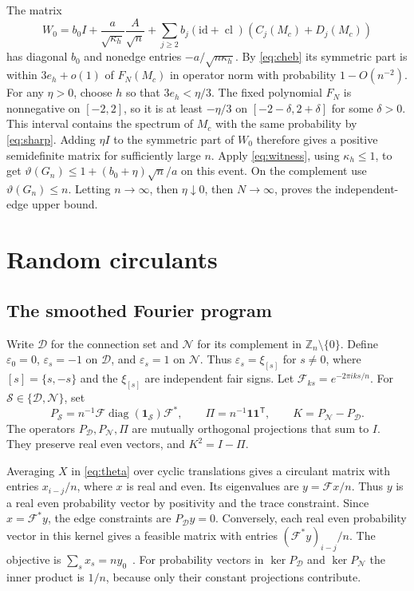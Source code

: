 \documentclass[preprints,article,submit,oneauthor]{Definitions/mdpi}
\newcommand{\Z}{\mathbb Z}
\newcommand{\one}{\mathbf 1}
\begin{document}
The matrix
\[
 W_0=b_0 I+\frac{a}{\sqrt{\kappa_h}}\frac{A}{\sqrt n}
       +\sum_{j\ge2} b_j (\mathrm{id}+\operatorname{cl})(C_j(M_c)+D_j(M_c))
\]
has diagonal \(b_0\) and nonedge entries \(-a/\sqrt{n\kappa_h}\). By
\eqref{eq:cheb} its symmetric part is within \(3e_h+o(1)\) of
\(F_N(M_c)\) in operator norm with probability \(1-O(n^{-2})\).
For any \(\eta>0\), choose \(h\) so that \(3e_h<\eta/3\). The fixed
polynomial \(F_N\) is nonnegative on \([-2,2]\), so it is at least
\(-\eta/3\) on \([-2-\delta,2+\delta]\) for some \(\delta>0\). This
interval contains the spectrum of \(M_c\) with the same probability
by \eqref{eq:sharp}. Adding \(\eta I\) to the symmetric part of
\(W_0\) therefore gives a positive semidefinite matrix for sufficiently
large \(n\). Apply \eqref{eq:witness}, using \(\kappa_h\le1\), to get
\(\vartheta(G_n)\le 1+(b_0+\eta)\sqrt n/a\) on this event. On the
complement use \(\vartheta(G_n)\le n\). Letting \(n\to\infty\), then
\(\eta\downarrow0\), then \(N\to\infty\), proves the independent-edge
upper bound.

\section{Random circulants}\label{sec:circulant}

\subsection{The smoothed Fourier program}

Write \(\mathcal D\) for the connection set and \(\mathcal N\) for its
complement in \(\Z_n\setminus\{0\}\). Define \(\varepsilon_0=0\),
\(\varepsilon_s=-1\) on \(\mathcal D\), and \(\varepsilon_s=1\) on
\(\mathcal N\). Thus \(\varepsilon_s=\xi_{[s]}\) for \(s\ne0\), where
\([s]=\{s,-s\}\) and the \(\xi_{[s]}\) are independent fair signs.
Let \(\mathcal F_{ks}=e^{-2\pi i ks/n}\). For
\(\mathcal S\in\{\mathcal D,\mathcal N\}\), set
\[
 P_{\mathcal S}=n^{-1}\mathcal F\operatorname{diag}(\one_{\mathcal S})\mathcal F^*,
 \qquad \Pi=n^{-1}\one\one^{\mathsf T},\qquad K=P_{\mathcal N}-P_{\mathcal D}.
\]
The operators \(P_{\mathcal D},P_{\mathcal N},\Pi\) are mutually orthogonal
projections that sum to \(I\). They preserve real even vectors, and
\(K^2=I-\Pi\).

Averaging \(X\) in \eqref{eq:theta} over cyclic translations gives a
circulant matrix with entries \(x_{i-j}/n\), where \(x\) is real and even.
Its eigenvalues are \(y=\mathcal F x/n\). Thus \(y\) is a real even
probability vector by positivity and the trace constraint. Since
\(x=\mathcal F^*y\), the edge constraints are \(P_{\mathcal D}y=0\).
Conversely, each real even probability vector in this kernel gives a
feasible matrix with entries \((\mathcal F^*y)_{i-j}/n\).
The objective is \(\sum_s x_s=ny_0\)~\cite{BBDFKK}.
For probability vectors in \(\ker P_{\mathcal D}\) and
\(\ker P_{\mathcal N}\) the inner product is \(1/n\), because only
their constant projections contribute.
\end{document}
